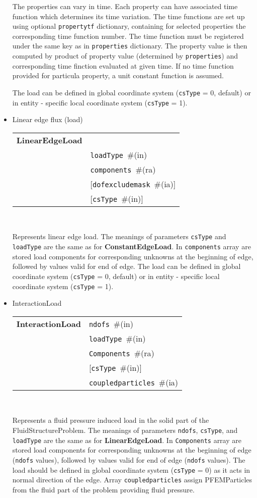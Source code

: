 \documentclass[a4paper]{article}
\makeatletter
\newcommand{\param}[1]{\texttt{#1}} %
\newcommand{\optional}[1]{[#1]} %
\newcommand{\field}[2]{\param{#1}~\#{\tiny(#2)}} %
\newcommand{\optField}[2]{\optional{\field{#1}{#2}}}
\newcommand{\entKeywordInst}[1]{\textbf{#1}} %
\newenvironment{record}[1][]{\begin{tabular}{|ll}}{\end{tabular}\\}
\newcommand{\recentry}[2]{{#1}&{#2}\\}
\newcounter{rcc}
\newenvironment{record}[1][\textwidth]{\setcounter{rcc}{0}\begin{tabular*}{#1}{|ll@{\extracolsep{\fill}}r}}{\end{tabular*}\\}
\newcommand{\recentry}[2]{\ifthenelse{\value{rcc}>0}{&$\backslash$ \\}{\setcounter{rcc}{1}}{#1}&{#2}}
\makeatother
\begin{document}
\begin{itemize}
The properties can vary in time. Each property can have associated time function which determines its time variation. The time functions are set up using optional \param{propertytf} dictionary, containing for selected properties the corresponding time function number. The time function must be registered under the same key as in \param{properties} dictionary. The property value is then computed by product of property value (determined by \param{properties}) and corresponding time finction evaluated at given time. If no time function provided for particula property, a unit constant function is assumed.

The load can be defined in global coordinate system (\param{csType} =
0, default) or in entity - specific local coordinate system
(\param{csType} = 1).
\item Linear edge flux (load)

\begin{record}[0.9\textwidth]
  \recentry{\entKeywordInst{LinearEdgeLoad}}{}
  \recentry{}{\field{loadType}{in}}
  \recentry{}{\field{components}{ra}}
  \recentry{}{\optField{dofexcludemask}{ia}}
  \recentry{}{\optField{csType}{in}}
\end{record}

Represents linear edge load. The meanings of parameters \param{csType} and \param{loadType} are the same as for
\entKeywordInst{ConstantEdgeLoad}.
In \param{components} array are stored load components for corresponding unknowns at the
beginning of edge, followed by values valid for end of edge.
The load can be defined in global coordinate system (\param{csType} = 0, default) or in entity - specific local coordinate system
(\param{csType} = 1).
\item InteractionLoad

\begin{record}[0.9\textwidth]
  \recentry{\entKeywordInst{InteractionLoad}}{\field{ndofs}{in}}
  \recentry{}{\field{loadType}{in}}
  \recentry{}{\field{Components}{ra}}
  \recentry{}{\optField{csType}{in}}
  \recentry{}{\field{coupledparticles}{ia}}
\end{record}

Represents a fluid pressure induced load in the solid part of the FluidStructureProblem. 
The meanings of parameters \param{ndofs},
\param{csType}, and \param{loadType} are the same as for
\entKeywordInst{LinearEdgeLoad}. In \param{Components}
array are stored load components for corresponding unknowns at the
beginning of edge (\param{ndofs} values), followed by values valid for
end of edge (\param{ndofs} values). The load should be defined in global 
coordinate system (\param{csType} = 0) as it acts in normal direction of the edge.
Array \param{coupledparticles} assign PFEMParticles from the fluid part of the problem 
providing fluid pressure.

\end{itemize}
\end{document}
